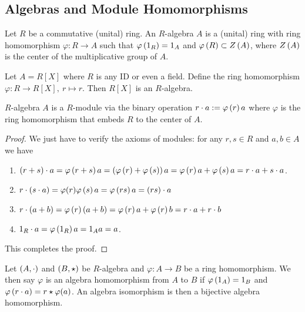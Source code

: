 \newpage

\subsection{Algebras and Module Homomorphisms}

\begin{defn} [$R$-Algebra]
    Let $R$ be a commutative (unital) ring. An $R$-algebra $A$ is a (unital) ring with ring homomorphism $\varphi:R\to A$ such that $\varphi\left(1_R\right)=1_A$ and $\varphi\left(R\right)\subset Z\left(A\right)$, where $Z\left(A\right)$ is the center of the multiplicative group of $A$.
\end{defn}

\medskip

\begin{ex}
    Let $A=R[X]$ where $R$ is any ID or even a field. Define the ring homomorphism $\varphi:R\to R[X],\ r\mapsto r$. Then $R[X]$ is an $R$-algebra.
\end{ex}

\medskip

\begin{pro}
    $R$-algebra $A$ is a $R$-module via the binary operation $r\cdot a:= \varphi\left(r\right)a$ where $\varphi$ is the ring homomorphism that embeds $R$ to the center of $A$.
\end{pro}
\begin{proof}
    We just have to verify the axioms of modules: for any $r,s\in R$ and $a,b\in A$ we have
    \begin{enumerate}
        \item $\left(r+s\right)\cdot a = \varphi\left(r+s\right)a = \left(\varphi\left(r\right)+\varphi\left(s\right)\right)a = \varphi\left(r\right)a + \varphi\left(s\right)a = r\cdot a + s\cdot a$.
        \item $r\cdot \left(s\cdot a\right) = \varphi(r)\varphi\left(s\right)a = \varphi\left(rs\right)a = \left(rs\right)\cdot a$
        \item $r\cdot \left(a+b\right) = \varphi\left(r\right)\left(a+b\right)=\varphi\left(r\right)a + \varphi\left(r\right)b = r\cdot a + r\cdot b$
        \item $1_R\cdot a = \varphi\left(1_R\right)a = 1_Aa = a$.
    \end{enumerate}
    This completes the proof.
\end{proof}

\medskip

\begin{defn} 
    Let $\left(A,\cdot\right)$ and $\left(B,\star\right)$ be $R$-algebra and $\varphi:A\to B$ be a ring homomorphism. We then say $\varphi$ is an algebra homomorphism from $A$ to $B$ if $\varphi\left(1_A\right)=1_B$ and $\varphi\left(r\cdot a\right)=r\star \varphi(a)$. An algebra isomorphism is then a bijective algebra homomorphism.
\end{defn}

